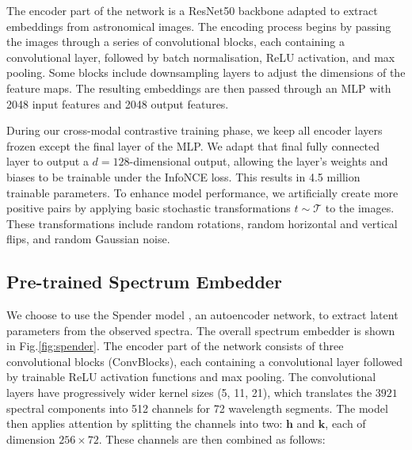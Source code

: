 \documentclass[a4paper,12pt]{article}
\begin{document}
The encoder part of the network is a ResNet50 backbone adapted to extract embeddings from astronomical images. The encoding process begins by passing the images through a series of convolutional blocks, each containing a convolutional layer, followed by batch normalisation, ReLU activation, and max pooling. Some blocks include downsampling layers to adjust the dimensions of the feature maps. The resulting embeddings are then passed through an MLP with 2048 input features and 2048 output features.

During our cross-modal contrastive training phase, we keep all encoder layers frozen except the final layer of the MLP. We adapt that final fully connected layer to output a $d=128$-dimensional output, allowing the layer's weights and biases to be trainable under the InfoNCE loss. This results in 4.5 million trainable parameters. To enhance model performance, we artificially create more positive pairs by applying basic stochastic transformations $t \sim \mathcal{T}$ to the images. These transformations include random rotations, random horizontal and vertical flips, and random Gaussian noise.








\subsection{Pre-trained Spectrum Embedder}
\label{sec:spender}
We choose to use the Spender model \cite{spender}, an autoencoder network, to extract latent parameters from the observed spectra. The overall spectrum embedder is shown in Fig.\ref{fig:spender}. The encoder part of the network consists of three convolutional blocks (ConvBlocks), each containing a convolutional layer followed by trainable ReLU activation functions and max pooling. The convolutional layers have progressively wider kernel sizes (5, 11, 21), which translates the $3921$ spectral components into 512 channels for 72 wavelength segments.  The model then applies attention by splitting the channels into two: $\mathbf{h}$ and $\mathbf{k}$, each of dimension $256 \times 72$. These channels are then combined as follows:
\end{document}
